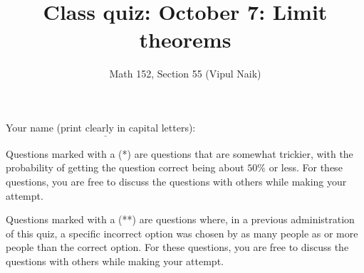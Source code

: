 \documentclass[10pt]{amsart}
\title{Class quiz: October 7: Limit theorems}
\author{Math 152, Section 55 (Vipul Naik)}
\begin{document}
\maketitle

Your name (print clearly in capital letters): $\underline{\qquad\qquad\qquad\qquad\qquad\qquad\qquad\qquad\qquad\qquad}$

Questions marked with a (*) are questions that are somewhat trickier,
with the probability of getting the question correct being about
$50\%$ or less. For these questions, you are free to discuss the questions
with others while making your attempt.

Questions marked with a (**) are questions where, in a previous
administration of this quiz, a specific incorrect option was chosen by
as many people as or more people than the correct option. For these
questions, you are free to discuss the questions with others while
making your attempt.
\end{document}
